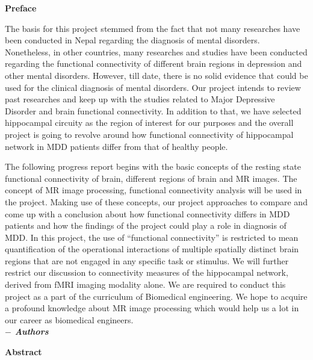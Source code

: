 \documentclass{article}
\begin{document}


\begingroup
\fontsize{12pt}{11pt}\selectfont

\clearpage
\setcounter{page}{1}
\hskip180pt {\textbf{\centering \Large Preface} }
\vskip40pt

The basis for this project stemmed from the fact that not many
researches have been conducted in Nepal regarding the diagnosis of
mental disorders. Nonetheless, in other countries, many researches and
studies have been conducted regarding the functional connectivity of
different brain regions in depression and other mental
disorders. However, till date, there is no solid evidence that could
be used for the clinical diagnosis of mental disorders. Our project
intends to review past researches and keep up with the studies related
to Major Depressive Disorder and brain functional connectivity. In
addition to that, we have selected hippocampal circuity as the region
of interest for our purposes and the overall project is going to
revolve around how functional connectivity of hippocampal network in
MDD patients differ from that of healthy people.

The following progress report begins with the basic concepts of the
resting state functional connectivity of brain, different regions of
brain and MR images. The concept of MR image processing, functional
connectivity analysis will be used in the project. Making use of these
concepts, our project approaches to compare and come up with a
conclusion about how functional connectivity differs in MDD patients
and how the findings of the project could play a role in diagnosis of
MDD. In this project, the use of ``functional connectivity'' is
restricted to mean quantification of the operational interactions of
multiple spatially distinct brain regions that are not engaged in any
specific task or stimulus. We will further restrict our discussion to
connectivity measures of the hippocampal network, derived from fMRI
imaging modality alone.  We are required to conduct this project as a
part of the curriculum of Biomedical engineering. We hope to acquire a
profound knowledge about MR image processing which would help us a lot
in our career as biomedical engineers. \\ [1cm]

\hspace*{137mm}\textbf{\textit {$-$ Authors}}
\newpage

\hskip180pt {\textbf{\centering \Large Abstract} }
\vskip2pt
\end{document}
